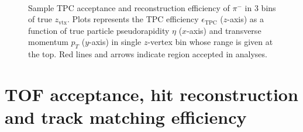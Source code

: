\begin{figure}[h!]
{\begin{subfigure}[b]{\linewidth}
		\end{subfigure}
	}%
	\quad%
	\parbox{0.485\textwidth}{
		\centering
		\begin{subfigure}[b]{\linewidth}\addtocounter{subfigure}{-2}
		\end{subfigure}\\[5pt]
		\begin{minipage}[t][0.78\linewidth][t]{\linewidth}\vspace{10pt}
		\caption[Sample TPC acceptance and reconstruction efficiency of $\pi^{-}$.]{Sample TPC acceptance and reconstruction efficiency of $\pi^{-}$ in 3 bins of true $z_{\text{vtx}}$. Plots represents the TPC efficiency $\epsilon_{\text{TPC}}$ ($z$-axis) as a function of true particle pseudorapidity $\eta$ ($x$-axis) and transverse momentum $p_{T}$ ($y$-axis) in single $z$-vertex bin whose range is given at the top. Red lines and arrows indicate region accepted in analyses.}\label{fig:tpcEff_pion_sample}
		\end{minipage}
	}
\end{figure}






\section{TOF acceptance, hit reconstruction and track matching efficiency}\label{sec:tofMatchEff}


